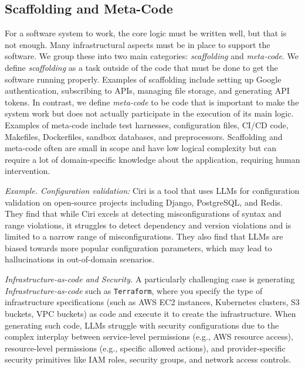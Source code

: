 \subsection{Scaffolding and Meta-Code} \label{subsec:scaffolding-metacode}

For a software system to work, the core logic must be written well, but that is not enough. Many infrastructural aspects must be in place to support the software. We group these into two main categories: \textit{scaffolding} and \textit{meta-code}. We define \textit{scaffolding} as a task outside of the code that must be done to get the software running properly. Examples of scaffolding include setting up Google authentication, subscribing to APIs, managing file storage, and generating API tokens. In contrast, we define \textit{meta-code} to be code that is important to make the system work but does not actually participate in the execution of its main logic. Examples of meta-code include test harnesses, configuration files, CI/CD code, Makefiles, Dockerfiles, sandbox databases, and preprocessors. Scaffolding and meta-code often are small in scope and have low logical complexity but can require a lot of domain-specific knowledge about the application, requiring human intervention.

\begin{tcolorbox}[colback=lightblue, boxrule=0pt, arc=5pt, outer arc=5pt]
\textit{Example. Configuration validation:} Ciri \citep{lian2024large} is a tool that uses LLMs for configuration validation on open-source projects including Django, PostgreSQL, and Redis. They find that while Ciri excels at detecting misconfigurations of syntax and range violations, it struggles to detect dependency and version violations and is limited to a narrow range of misconfigurations. They also find that LLMs are biased towards more popular configuration parameters, which may lead to hallucinations in out-of-domain scenarios. 
\end{tcolorbox}

\textit{Infrastructure-as-code and Security.} A particularly challenging case is generating \textit{Infrastructure-as-code} such as \texttt{Terraform}, where you specify the type of infrastructure specifications (such as AWS EC2 instances, Kubernetes clusters, S3 buckets, VPC buckets) as code and execute it to create the infrastructure. When generating such code, LLMs struggle with security configurations due to the complex interplay between service-level permissions (e.g., AWS resource access), resource-level permissions (e.g., specific allowed actions), and provider-specific security primitives like IAM roles, security groups, and network access controls.

